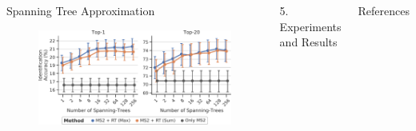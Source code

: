 \documentclass{beamer}
\begin{document}
\begin{frame}{}
\begin{columns}[T]

\begin{block}{{\normalsize Spanning Tree Approximation}}
\begin{figure}
    \centering
    \includegraphics[width=\textwidth]{images/number_of_random_spanning_trees.pdf}
\end{figure}
\end{block}


\begin{block}{{\normalsize 5. Experiments and Results}}
\end{block}



\vfill

\begin{block}{\small References}
\end{block}

\end{columns}

\vfill

\end{frame}
\end{document}
